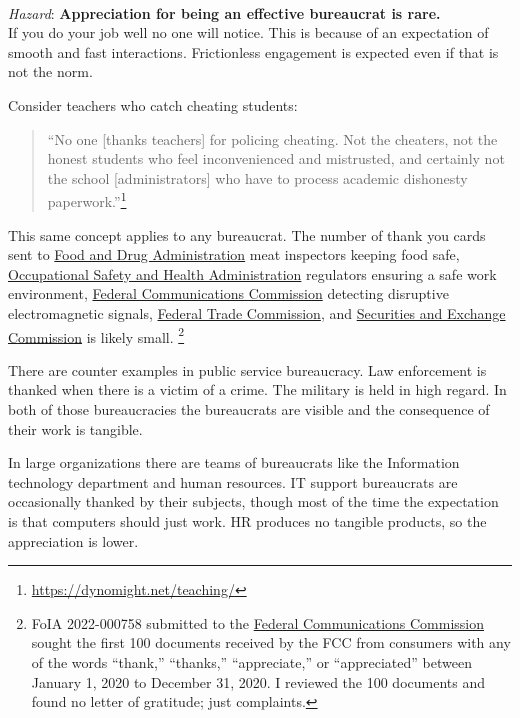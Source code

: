 \ \\
\begin{samepage}
\textit{Hazard}: \textbf{Appreciation for being an effective bureaucrat is rare.}\\
If you do your job well no one will notice. This is because of an expectation of smooth and fast interactions. Frictionless engagement is expected even if that is not the norm. 

Consider teachers who catch cheating students:
\begin{quote}
``No one [thanks teachers] for policing cheating. Not the cheaters, not the honest students who feel inconvenienced and mistrusted, and certainly not the school [administrators] who have to process academic dishonesty paperwork.''\footnote{\href{https://dynomight.net/teaching/}{https://dynomight.net/teaching/}}
\end{quote}
\end{samepage}

This same concept applies to any bureaucrat. The number of thank you cards sent to \href{https://www.fda.gov/}{Food and Drug Administration} meat inspectors keeping food safe, \href{https://www.osha.gov/}{Occupational Safety and Health Administration} regulators ensuring a safe work environment, \href{https://www.fcc.gov/}{Federal Communications Commission} detecting disruptive electromagnetic signals, \href{https://www.ftc.gov/}{Federal Trade Commission}, and \href{https://www.sec.gov/}{Securities and Exchange Commission} is likely small.
\footnote{FoIA 2022-000758 submitted to the \href{https://www.fcc.gov/}{Federal Communications Commission}  
sought the first 100 documents received by the FCC from consumers with any of the words ``thank,'' ``thanks,'' ``appreciate,'' or ``appreciated'' between January 1, 2020 to December 31, 2020. 
I reviewed the 100 documents and found no letter of gratitude; just complaints.}

There are counter examples in public service bureaucracy. 
Law enforcement is thanked when there is a victim of a crime. 
The military is held in high regard. 
In both of those bureaucracies the bureaucrats are visible and the consequence of their work is tangible. 

In large organizations there are teams of bureaucrats like the Information technology department and human resources. IT support bureaucrats are occasionally thanked by their subjects, though most of the time the expectation is that computers should just work. HR produces no tangible products, so the appreciation is lower.


